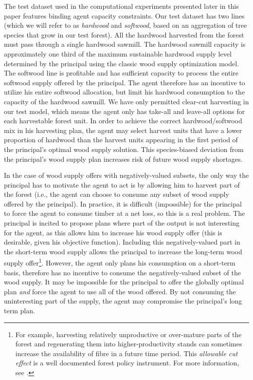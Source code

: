 The test dataset used in the computational experiments presented later in this paper features binding agent capacity constraints.
Our test dataset has two lines (which we will refer to as \emph{hardwood} and \emph{softwood}, based on an aggregation of tree species that grow in our test forest).
All the hardwood harvested from the forest must pass through a single hardwood sawmill.
The hardwood sawmill capacity is approximately one third of the maximum sustainable hardwood supply level determined by the principal using the classic wood supply optimization model.
The softwood line is profitable and has sufficient capacity to process the entire softwood supply offered by the principal.
The agent therefore has an incentive to utilize his entire softwood allocation, but limit his hardwood consumption to the capacity of the hardwood sawmill.
We have only permitted clear-cut harvesting in our test model, which means the agent only has take-all and leave-all options for each harvestable forest unit.
In order to achieve the correct hardwood/softwood mix in his harvesting plan, the agent may select harvest units that have a lower proportion of hardwood than the harvest units appearing in the first period of the principal's optimal wood supply solution.
This species-biased deviation from the principal's wood supply plan increases risk of future wood supply shortages.

In the case of wood supply offers with negatively-valued subsets, the only way the principal has to motivate the agent to act is by allowing him to harvest part of the forest (i.e., the agent can choose to consume any subset of wood supply offered by the principal). 
In practice, it is difficult (impossible) for the principal to force the agent to consume timber at a net loss, so this is a real problem. 
The principal is incited to propose plans where part of the output is not interesting for the agent, as this allows him to increase his wood supply offer (this is desirable, given his objective function). 
Including this negatively-valued part in the short-term wood supply allows the principal to increase the long-term wood supply offer\footnote{For example, harvesting relatively unproductive or over-mature parts of the forest and regenerating them into higher-productivity stands can sometimes increase the availability of fibre in a future time period. This \emph{allowable cut effect} is a well documented forest policy instrument. For more information, see \citet{luckert1995allowable}.}.
However, the agent only plans his consumption on a short-term basis, therefore has no incentive to consume the negatively-valued subset of the wood supply.
It may be impossible for the principal to offer the globally optimal plan \emph{and} force the agent to use all of the wood offered. 
By not consuming the uninteresting part of the supply, the agent may compromise the principal's long term plan.

